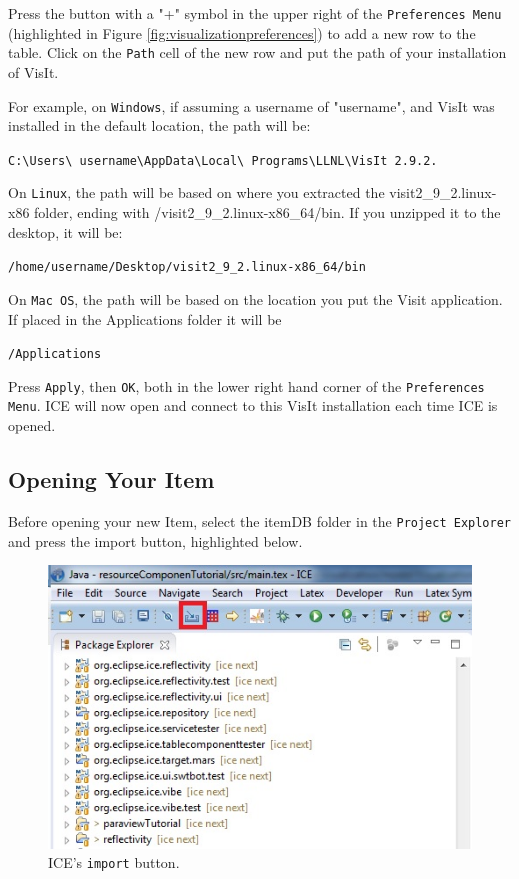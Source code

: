 Press the button with a "+" symbol in the upper right of the
\texttt{Preferences Menu} (highlighted in Figure
\ref{fig:visualizationpreferences}) to add a new row to the table.
Click on the \texttt{Path} cell of the new row and put the path of your installation of VisIt.

For example, on \texttt{Windows}, if assuming a username of "username", and
VisIt was installed in the default location, the path will be:

\texttt{C:\textbackslash Users\textbackslash
username\textbackslash AppData\textbackslash Local\textbackslash
Programs\textbackslash LLNL\textbackslash VisIt 2.9.2.}

On \texttt{Linux}, the path will be based on where you extracted the 
visit2\_9\_2.linux-x86 folder, ending with /visit2\_9\_2.linux-x86\_64/bin. If
you unzipped it to the desktop, it will be:
 
\texttt{/home/username/Desktop/visit2\_9\_2.linux-x86\_64/bin}

On \texttt{Mac OS}, the path will be based on the location you put the Visit
application. If placed in the Applications folder it will be

\texttt{/Applications}

Press \texttt{Apply}, then \texttt{OK}, both in the lower right hand corner of
the \texttt{Preferences Menu}.
ICE will now open and connect to this VisIt installation each time ICE is opened.

\subsection{Opening Your Item}
Before opening your new Item, select the itemDB folder in the \texttt{Project
Explorer} and press the import button, highlighted below.

\begin{figure}[!h]
\includegraphics[width=12cm]{images/ImportButton}
\centering
\caption{ICE's \texttt{import} button.}
\label{fig:importbutton}
\end{figure}

